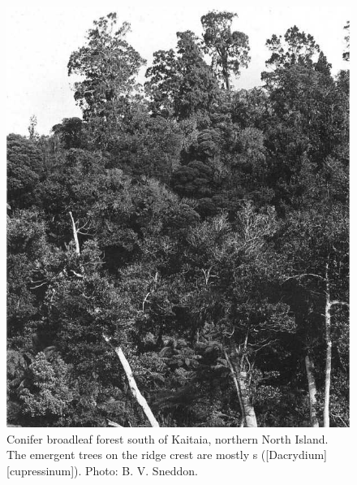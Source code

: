 \begin{figure}[!htb]
	\centering
	\begin{minipage}[t]{0.534\textwidth}
		\centering
		\includegraphics[width=\textwidth]{graphics/figure7conifer.jpg}
    	\caption[Conifer broadleaf forest south of Kaitaia]{Conifer broadleaf forest south of Kaitaia, northern North Island.
        The emergent trees on the ridge crest are mostly s ([Dacrydium][cupressinum]).
    	Photo: B. V. Sneddon.}%
    	\label{fig:7conifer}
	\end{minipage}\hfill%
	\begin{minipage}[t]{0.446\textwidth}
    	\centering

\end{minipage}
\end{figure}
